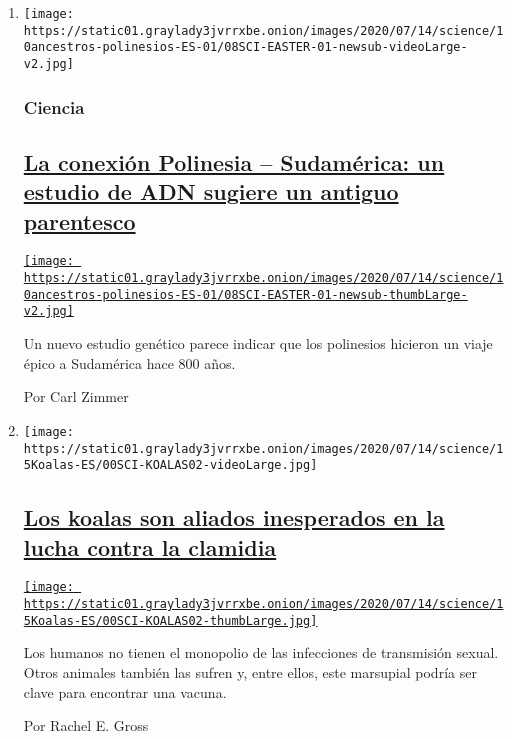 \begin{enumerate}
\def\labelenumi{\arabic{enumi}.}
\item
  \texttt{[image: https://static01.graylady3jvrrxbe.onion/images/2020/07/14/science/10ancestros-polinesios-ES-01/08SCI-EASTER-01-newsub-videoLarge-v2.jpg]}

  \hypertarget{ciencia}{%
  \subsubsection{Ciencia}\label{ciencia}}

  \hypertarget{la-conexiuxf3n-polinesia--sudamuxe9rica-un-estudio-de-adn-sugiere-un-antiguo-parentesco}{%
  \subsection{\texorpdfstring{\href{/es/2020/07/10/espanol/ciencia-y-tecnologia/polinesios-estudio-genetico.html}{La
  conexión Polinesia -- Sudamérica: un estudio de ADN sugiere un antiguo
  parentesco}}{La conexión Polinesia -- Sudamérica: un estudio de ADN sugiere un antiguo parentesco}}\label{la-conexiuxf3n-polinesia--sudamuxe9rica-un-estudio-de-adn-sugiere-un-antiguo-parentesco}}

  \href{/es/2020/07/10/espanol/ciencia-y-tecnologia/polinesios-estudio-genetico.html}{\texttt{[image: https://static01.graylady3jvrrxbe.onion/images/2020/07/14/science/10ancestros-polinesios-ES-01/08SCI-EASTER-01-newsub-thumbLarge-v2.jpg]}}

  Un nuevo estudio genético parece indicar que los polinesios hicieron
  un viaje épico a Sudamérica hace 800 años.

  Por Carl Zimmer
\item
  \texttt{[image: https://static01.graylady3jvrrxbe.onion/images/2020/07/14/science/15Koalas-ES/00SCI-KOALAS02-videoLarge.jpg]}

  \hypertarget{los-koalas-son-aliados-inesperados-en-la-lucha-contra-la-clamidia}{%
  \subsection{\texorpdfstring{\href{/es/2020/07/15/espanol/ciencia-y-tecnologia/koalas-clamidia.html}{Los
  koalas son aliados inesperados en la lucha contra la
  clamidia}}{Los koalas son aliados inesperados en la lucha contra la clamidia}}\label{los-koalas-son-aliados-inesperados-en-la-lucha-contra-la-clamidia}}

  \href{/es/2020/07/15/espanol/ciencia-y-tecnologia/koalas-clamidia.html}{\texttt{[image: https://static01.graylady3jvrrxbe.onion/images/2020/07/14/science/15Koalas-ES/00SCI-KOALAS02-thumbLarge.jpg]}}

  Los humanos no tienen el monopolio de las infecciones de transmisión
  sexual. Otros animales también las sufren y, entre ellos, este
  marsupial podría ser clave para encontrar una vacuna.

  Por Rachel E. Gross
\end{enumerate}

